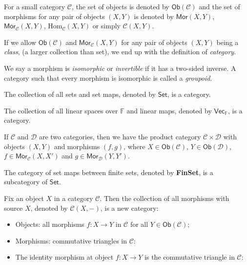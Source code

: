 \documentclass[
	11pt, %
	fleqn, %
	a4paper, %
]{LegrandOrangeBook}
\newcommand{\F}{\mathbb{F}} %
\newcommand{\C}{\mathcal{C}} %
\newcommand{\D}{\mathcal{D}} %
\newcommand{\Set}{\boldsymbol{\mathsf{Set}}} %
\newcommand{\Vect}{\boldsymbol{\mathsf{Vec}}} %
\newcommand{\Mor}{\mathsf{Mor}} %
\newcommand{\Ob}[1]{\mathsf{Ob}(#1)} %
\begin{document}
For a small category $\C$, the set of objects is denoted by $\Ob{\C}$ and the set of morphisms for any pair of objects $(X, Y)$ is denoted by $\Mor(X, Y)$, $\Mor_{\C} (X, Y)$, Hom$_{\C}(X, Y)$ or simply $\C(X, Y)$.

If we allow $\Ob{\C}$ and $\Mor_{\C}(X, Y)$ for any pair of objects $(X, Y)$ being a \emph{class}, (a larger collection than set), we end up with the definition of \emph{category}.

We say a morphism is \emph{isomorphic} or \emph{invertible} if it has a two-sided inverse. A category such that every morphism is isomorphic is called a \emph{groupoid}.

\begin{example}
    The collection of all sets and set maps, denoted by $\Set$, is a category.
\end{example}

\begin{example}
    The collection of all linear spaces over $\F$ and linear maps, denoted by $\Vect_{\F}$, is a category.
\end{example}

\begin{example}
    If $\C$ and $\D$ are two categories, then we have the product category $\C \times \D$ with objects $(X, Y)$ and morphisms $(f, g)$, where $X \in \Ob{\C}$, $Y \in \Ob{\D}$, $f \in \Mor_{\C}(X, X')$ and $g \in \Mor_{\D}(Y, Y')$.
\end{example}

\begin{example}
    The category of set maps between finite sets, denoted by \textbf{FinSet}, is a subcategory of $\Set$.
\end{example}

\begin{example}
    Fix an object $X$ in a category $\C$. Then the collection of all morphisms with source $X$, denoted by $\C(X, -)$, is a new category:
    \begin{itemize}
        \item Objects: all morphisms $f : X \to Y$ in $\C$ for all $Y \in \Ob{\C}$;
        \item Morphisms: commutative triangles in $\C$:
        \begin{center}
        \end{center}
        \item The identity morphism at object $f : X \to Y$ is the commutative triangle in $\C$:
        \begin{center}
        \end{center}
    \end{itemize} 
\end{example}
\end{document}
